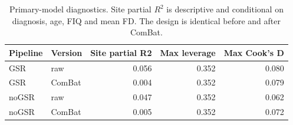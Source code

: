 \begin{table}[htbp]
\centering
\small
\caption{Primary-model diagnostics. Site partial $R^2$ is descriptive and conditional on diagnosis, age, FIQ and mean FD. The design is identical before and after ComBat.}\label{tab:Sdiag}
\begin{tabular}{llrrr}
\toprule
Pipeline & Version & Site partial R2 & Max leverage & Max Cook's D \\
\midrule
GSR & raw & 0.056 & 0.352 & 0.080 \\
GSR & ComBat & 0.004 & 0.352 & 0.079 \\
noGSR & raw & 0.047 & 0.352 & 0.062 \\
noGSR & ComBat & 0.005 & 0.352 & 0.072 \\
\bottomrule
\end{tabular}
\end{table}
